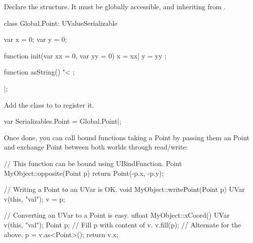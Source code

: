 Declare the \us structure. It must be globally accessible, and inheriting
from .
\begin{urbiscript}
class Global.Point: UValueSerializable
{
  var x = 0;
  var y = 0;

  function init(var xx = 0, var yy = 0)
  {
    x = xx|
    y = yy
  };

  function asString()
  {
    "<%
  };
}|;
\end{urbiscript}

\noindent
Add the class to  to register it.

\begin{urbiscript}
var Serializables.Point = Global.Point|;
\end{urbiscript}

Once done, you can call bound functions taking a \Cxx Point by passing them
an \us Point and exchange Point between both worlds through \UVar
read/write:

\begin{cxx}
// This function can be bound using UBindFunction.
Point MyObject::opposite(Point p)
{
  return Point(-p.x, -p.y);
}

// Writing a Point to an UVar is OK.
void MyObject::writePoint(Point p)
{
  UVar v(this, "val");
  v = p;
}

// Converting an UVar to a Point is easy.
ufloat MyObject::xCoord()
{
  UVar v(this, "val");
  Point p;
  // Fill p with content of v.
  v.fill(p);
  // Alternate for the above.
  p = v.as<Point>();
  return v.x;
}
\end{cxx}

